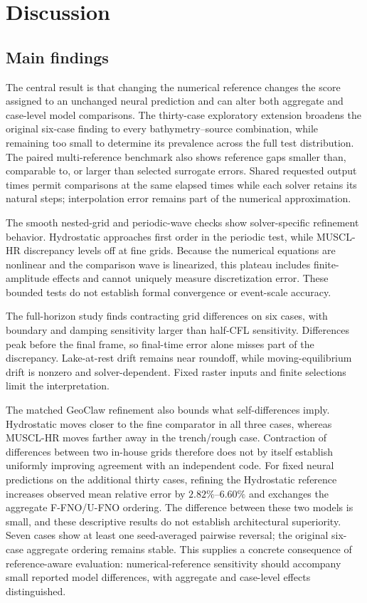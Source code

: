 \section{Discussion}
\label{sec:discussion}

\subsection{Main findings}
The central result is that changing the numerical reference changes the score assigned to an unchanged neural prediction and can alter both aggregate and case-level model comparisons. The thirty-case exploratory extension broadens the original six-case finding to every bathymetry--source combination, while remaining too small to determine its prevalence across the full test distribution. The paired multi-reference benchmark also shows reference gaps smaller than, comparable to, or larger than selected surrogate errors. Shared requested output times permit comparisons at the same elapsed times while each solver retains its natural steps; interpolation error remains part of the numerical approximation.

The smooth nested-grid and periodic-wave checks show solver-specific refinement behavior. Hydrostatic approaches first order in the periodic test, while MUSCL-HR discrepancy levels off at fine grids. Because the numerical equations are nonlinear and the comparison wave is linearized, this plateau includes finite-amplitude effects and cannot uniquely measure discretization error. These bounded tests do not establish formal convergence or event-scale accuracy.

The full-horizon study finds contracting grid differences on six cases, with boundary and damping sensitivity larger than half-CFL sensitivity. Differences peak before the final frame, so final-time error alone misses part of the discrepancy. Lake-at-rest drift remains near roundoff, while moving-equilibrium drift is nonzero and solver-dependent. Fixed raster inputs and finite selections limit the interpretation.

The matched GeoClaw refinement also bounds what self-differences imply. Hydrostatic moves closer to the fine comparator in all three cases, whereas MUSCL-HR moves farther away in the trench/rough case. Contraction of differences between two in-house grids therefore does not by itself establish uniformly improving agreement with an independent code. For fixed neural predictions on the additional thirty cases, refining the Hydrostatic reference increases observed mean relative error by $2.82\%$--$6.60\%$ and exchanges the aggregate F-FNO/U-FNO ordering. The difference between these two models is small, and these descriptive results do not establish architectural superiority. Seven cases show at least one seed-averaged pairwise reversal; the original six-case aggregate ordering remains stable. This supplies a concrete consequence of reference-aware evaluation: numerical-reference sensitivity should accompany small reported model differences, with aggregate and case-level effects distinguished.

